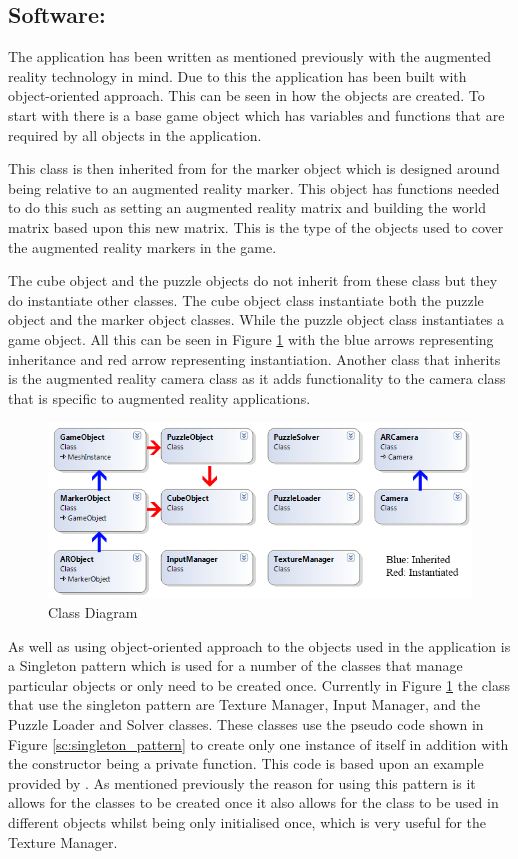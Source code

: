\subsection{Software:}\label{sc:software}
The application has been written as mentioned previously with the augmented reality technology in mind.
Due to this the application has been built with object-oriented approach.
This can be seen in how the objects are created.
To start with there is a base game object which has variables and functions that are required by all objects in the application.

This class is then inherited from for the marker object which is designed around being relative to an augmented reality marker.
This object has functions needed to do this such as setting an augmented reality matrix and building the world matrix based upon this new matrix.
This is the type of the objects used to cover the augmented reality markers in the game.

The cube object and the puzzle objects do not inherit from these class but they do instantiate other classes.
The cube object class instantiate both the puzzle object and the marker object classes.
While the puzzle object class instantiates a game object.
All this can be seen in Figure \ref{fig:ClassDiagrams} with the blue arrows representing inheritance and red arrow representing instantiation.
Another class that inherits is the augmented reality camera class as it adds functionality to the camera class that is specific to augmented reality applications.

\begin{figure}[ht!]
	\label{fig:ClassDiagrams}
	\centering
	\includegraphics[width=\textwidth]{images/ClassDiagram2.PNG}
	\caption{Class Diagram}
\end{figure}

As well as using object-oriented approach to the objects used in the application is a Singleton pattern which is used for a number of the classes that manage particular objects or only need to be created once.
Currently in Figure \ref{fig:ClassDiagrams} the class that use the singleton pattern are Texture Manager, Input Manager, and the Puzzle Loader and Solver classes.
These classes use the pseudo code shown in Figure \ref{sc:singleton_pattern} to create only one instance of itself in addition with the constructor being a private function.
This code is based upon an example provided by \cite{codeproject2002}. 
As mentioned previously the reason for using this pattern is it allows for the classes to be created once it also allows for the class to be used in different objects whilst being only initialised once, which is very useful for the Texture Manager.

